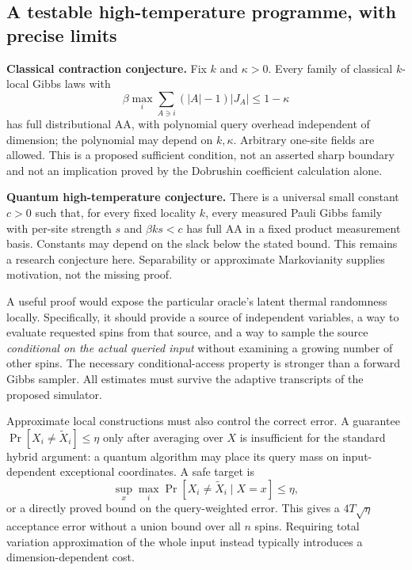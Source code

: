 \subsection{A testable high-temperature programme, with precise limits}
\label{threshold_physics:conjectures}

\textbf{Classical contraction conjecture.}
Fix \(k\) and \(\kappa>0\). Every family of classical \(k\)-local Gibbs
laws with
\[
 \beta\max_i\sum_{A\ni i}(|A|-1)|J_A|\le1-\kappa
\]
has full distributional AA, with polynomial query overhead independent
of dimension; the polynomial may depend on \(k,\kappa\). Arbitrary
one-site fields are allowed. This is a proposed sufficient condition,
not an asserted sharp boundary and not an implication proved by the
Dobrushin coefficient calculation alone.

\textbf{Quantum high-temperature conjecture.}
There is a universal small constant \(c>0\) such that, for every fixed
locality \(k\), every measured Pauli Gibbs family with per-site
strength \(s\) and \(\beta ks<c\) has full AA in a fixed product
measurement basis. Constants may depend on the slack below the stated
bound. This remains a research conjecture here. Separability or
approximate Markovianity supplies motivation, not the missing proof.

A useful proof would expose the particular oracle's latent thermal
randomness locally. Specifically, it should provide a source of
independent variables, a way to evaluate requested spins from that
source, and a way to sample the source \emph{conditional on the actual
queried input} without examining a growing number of other spins.
The necessary conditional-access property is stronger than a forward
Gibbs sampler. All estimates must survive the adaptive transcripts of
the proposed simulator.

Approximate local constructions must also control the correct error.
A guarantee \(\Pr[X_i\ne\widetilde X_i]\le\eta\) only after averaging
over \(X\) is insufficient for the standard hybrid argument: a quantum
algorithm may place its query mass on input-dependent exceptional
coordinates. A safe target is
\[
 \sup_x\max_i\Pr[X_i\ne\widetilde X_i\mid X=x]\le\eta,
\]
or a directly proved bound on the query-weighted error. This gives a
\(4T\sqrt\eta\) acceptance error without a union bound over all \(n\)
spins. Requiring total variation approximation of the whole input
instead typically introduces a dimension-dependent cost.

